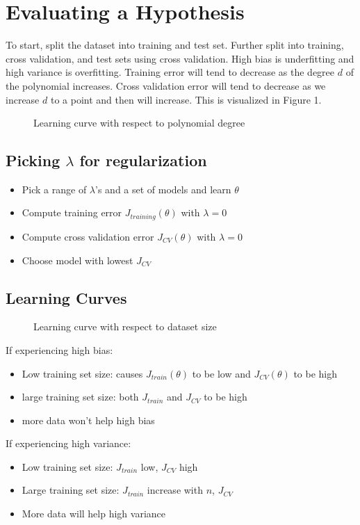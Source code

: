 \documentclass[12pt]{article}
\begin{document}
\section{Evaluating a Hypothesis}
To start, split the dataset into training and test set. Further split into training, cross validation, and test sets using cross validation. High bias is underfitting and high variance is overfitting. Training error will tend to decrease as the degree $d$ of the polynomial increases. Cross validation error will tend to decrease as we increase $d$ to a point and then will increase. This is visualized in Figure 1.\\ 

\begin{figure}
\centering
\caption{Learning curve with respect to polynomial degree}
\label{fig:polynomiallearning}
\end{figure}
\subsection{Picking $\lambda$ for regularization}
\begin{itemize}
	\item Pick a range of $\lambda$'s and a set of models and learn $\theta$
	\item Compute training error $J_{training}(\theta)$ with $\lambda=0$
	\item Compute cross validation error $J_{CV}(\theta)$ with $\lambda=0$
	\item Choose model with lowest $J_{CV}$
\end{itemize}

\subsection{Learning Curves}
\begin{figure}
\centering
\caption{Learning curve with respect to dataset size}
\label{fig:learningcurves}
\end{figure}
If experiencing high bias:
\begin{itemize}
	\item Low training set size: causes $J_{train}(\theta)$ to be low and $J_{CV}(\theta)$ to be high
	\item large training set size: both $J_{train}$ and $J_{CV}$ to be high
	\item more data won't help high bias
\end{itemize}
If experiencing high variance:
\begin{itemize}
	\item Low training set size: $J_{train}$ low, $J_{CV}$ high
	\item Large training set size: $J_{train}$ increase with $n$, $J_{CV}$
	\item More data will help high variance
\end{itemize}
\end{document}
